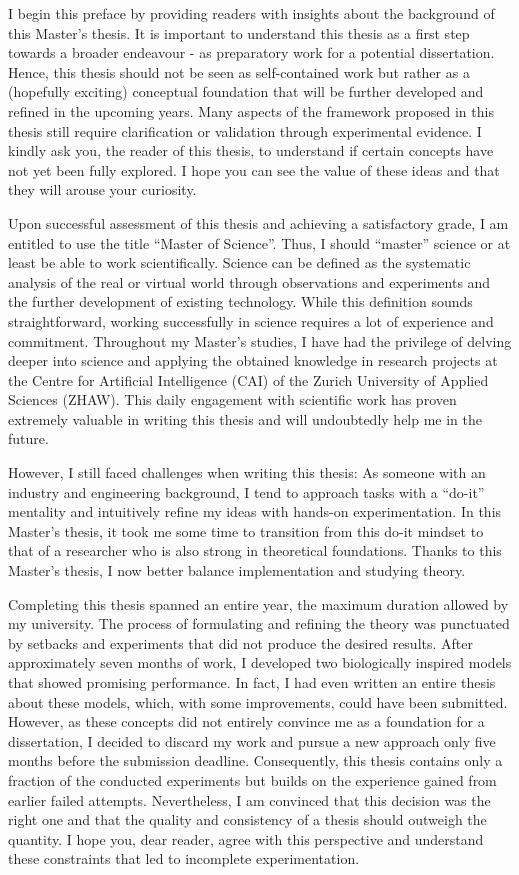 \small
I begin this preface by providing readers with insights about the background of this Master's thesis.
It is important to understand this thesis as a first step towards a broader endeavour - as preparatory work for a potential dissertation.
Hence, this thesis should not be seen as self-contained work but rather as a (hopefully exciting) conceptual foundation that will be further developed and refined in the upcoming years.
Many aspects of the framework proposed in this thesis still require clarification or validation through experimental evidence. I kindly ask you, the reader of this thesis, to understand if certain concepts have not yet been fully explored. I hope you can see the value of these ideas and that they will arouse your curiosity.

Upon successful assessment of this thesis and achieving a satisfactory grade, I am entitled to use the title ``Master of Science''.
Thus, I should ``master'' science or at least be able to work scientifically.
Science can be defined as the systematic analysis of the real or virtual world through observations and experiments and the further development of existing technology.
While this definition sounds straightforward, working successfully in science requires a lot of experience and commitment.
Throughout my Master's studies, I have had the privilege of delving deeper into science and applying the obtained knowledge in research projects at the Centre for Artificial Intelligence (CAI) of the Zurich University of Applied Sciences (ZHAW).
This daily engagement with scientific work has proven extremely valuable in writing this thesis and will undoubtedly help me in the future.

However, I still faced challenges when writing this thesis:
As someone with an industry and engineering background, I tend to approach tasks with a ``do-it'' mentality and intuitively refine my ideas with hands-on experimentation. 
In this Master's thesis, it took me some time to transition from this do-it mindset to that of a researcher who is also strong in theoretical foundations. Thanks to this Master's thesis, I now better balance implementation and studying theory.

Completing this thesis spanned an entire year, the maximum duration allowed by my university.
The process of formulating and refining the theory was punctuated by setbacks and experiments that did not produce the desired results.
After approximately seven months of work, I developed two biologically inspired models that showed promising performance. 
In fact, I had even written an entire thesis about these models, which, with some improvements, could have been submitted.
However, as these concepts did not entirely convince me as a foundation for a dissertation, I decided to discard my work and pursue a new approach only five months before the submission deadline.
Consequently, this thesis contains only a fraction of the conducted experiments but builds on the experience gained from earlier failed attempts.
Nevertheless, I am convinced that this decision was the right one and that the quality and consistency of a thesis should outweigh the quantity.
I hope you, dear reader, agree with this perspective and understand these constraints that led to incomplete experimentation.

